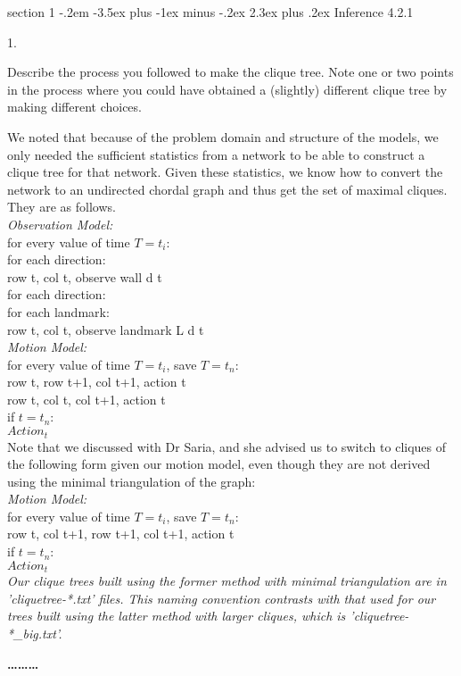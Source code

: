 \documentclass[12pt]{article}
\makeatletter
\newenvironment{problem}{\@startsection
       {section}
       {1}
       {-.2em}
       {-3.5ex plus -1ex minus -.2ex}
       {2.3ex plus .2ex}
       {\pagebreak[3]%
       \large\bf\noindent{Problem }
       }
       }
       {%
       \begin{center}\large\bf \ldots\ldots\ldots\end{center}}
\makeatother
\begin{document}
\begin{problem}{Inference}
4.2.1

1.

Describe the process you followed to make the clique tree. Note one or two
points in the process where you could have obtained a (slightly) different clique tree by
making different choices.

We noted that because of the problem domain and structure of the models,
we only needed the sufficient statistics from a network to be able to 
construct a clique tree for that network.  Given these statistics, we 
know how to convert the network to an undirected chordal graph and thus
get the set of maximal cliques.  They are as follows. \\
\textit{Observation Model:}\\
for every value of time $T=t_i$:\\
\indent	for each direction:\\
\indent \indent row t, col t, observe wall d t\\
\indent	for each direction:\\
\indent	\indent	for each landmark:\\
\indent	\indent	\indent	row t, col t, observe landmark L d t\\
\textit{Motion Model:}\\
for every value of time $T=t_i$, save $T=t_n$:\\
\indent	row t, row t+1, col t+1, action t\\
\indent	row t, col t, col t+1, action t\\
if $t=t_n$: \\
\indent	$Action_t$ \\

\noindent Note that we discussed with Dr Saria, and she advised us to switch to cliques of the following form given our motion model, even though they are not derived using the minimal triangulation of the graph:\\
\textit{Motion Model:}\\
for every value of time $T=t_i$, save $T=t_n$:\\
\indent	row t, col t+1, row t+1, col t+1, action t\\
if $t=t_n$: \\
\indent	$Action_t$ \\
\textit{Our clique trees built using the former method with minimal triangulation are in 'cliquetree-*.txt' files.  This naming convention contrasts with that used for our trees built using the latter method with larger cliques, which is 'cliquetree-*_big.txt'.}\\


\end{problem}
\end{document}
